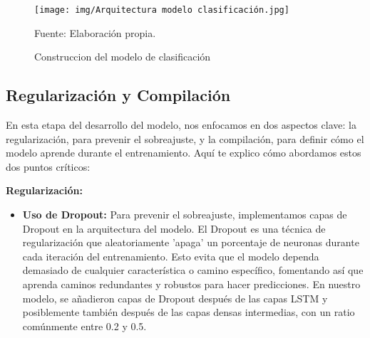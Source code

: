 \begin{figure}[H]
    \begin{minipage}[t]{0.9\textwidth}
        \caption{Construccion del modelo de clasificación}
        \label{parquitectura_clasificación}        
    \end{minipage}

    \vspace{10pt}

    \begin{minipage}[b]{1\textwidth}
        \centering
        \texttt{[image: img/Arquitectura modelo clasificación.jpg]}        
    \end{minipage}

    \begin{minipage}[t]{0.9\textwidth}
        Fuente: Elaboración propia.
    \end{minipage}
\end{figure}

\subsection{Regularización y Compilación}

En esta etapa del desarrollo del modelo, nos enfocamos en dos aspectos clave: la regularización, para prevenir el sobreajuste, y la compilación, para definir cómo el modelo aprende durante el entrenamiento. Aquí te explico cómo abordamos estos dos puntos críticos:

\textbf{Regularización:} 
\begin{itemize}
    \item \textbf{Uso de Dropout:} Para prevenir el sobreajuste, implementamos capas de Dropout en la arquitectura del modelo. El Dropout es una técnica de regularización que aleatoriamente 'apaga' un porcentaje de neuronas durante cada iteración del entrenamiento. Esto evita que el modelo dependa demasiado de cualquier característica o camino específico, fomentando así que aprenda caminos redundantes y robustos para hacer predicciones. En nuestro modelo, se añadieron capas de Dropout después de las capas LSTM y posiblemente también después de las capas densas intermedias, con un ratio comúnmente entre 0.2 y 0.5.
\end{itemize}

